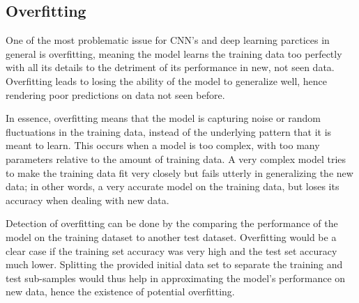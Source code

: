 \subsection{Overfitting}
One of the most problematic issue for CNN's and deep learning parctices in general is overfitting, meaning the model learns the training data too perfectly with all its details to the detriment of its performance in new, not seen data. Overfitting leads to losing the ability of the model to generalize well, hence rendering poor predictions on data not seen before.

In essence, overfitting means that the model is capturing noise or random fluctuations in the training data, instead of the underlying pattern that it is meant to learn. This occurs when a model is too complex, with too many parameters relative to the amount of training data. A very complex model tries to make the training data fit very closely but fails utterly in generalizing the new data; in other words, a very accurate model on the training data, but loses its accuracy when dealing with new data.

Detection of overfitting can be done by the comparing the performance of the model on the training dataset to another test dataset. Overfitting would be a clear case if the training set accuracy was very high and the test set accuracy much lower. Splitting the provided initial data set to separate the training and test sub-samples would thus help in approximating the model's performance on new data, hence the existence of potential overfitting.